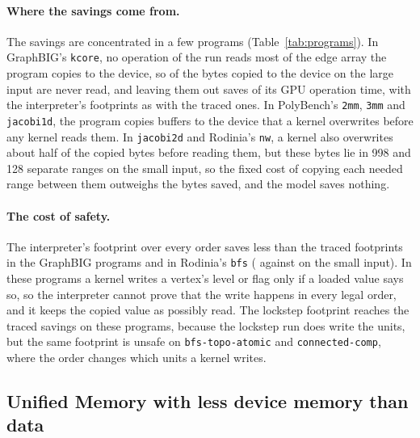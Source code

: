 \documentclass[11pt]{article}
\newcommand{\tabref}[1]{Table~\ref{#1}}
\newcommand{\code}[1]{\texttt{#1}}
\begin{document}
\paragraph{Where the savings come from.} The savings are concentrated in a few programs (\tabref{tab:programs}).
In GraphBIG's \code{kcore}, no operation of the run reads most of the edge array the program copies to the
device, so \numLargeKcoreHtoDUnneeded{} of the bytes copied to the device on the large input are never read, and
leaving them out saves \numLargeKcoreTr{} of its GPU operation time, with the interpreter's footprints as with the
traced ones. In PolyBench's \code{2mm}, \code{3mm} and \code{jacobi1d}, the program copies buffers to the device
that a kernel overwrites before any kernel reads them. In \code{jacobi2d} and Rodinia's \code{nw}, a kernel also
overwrites about half of the copied bytes before reading them, but these bytes lie in 998 and 128 separate ranges
on the small input, so the fixed cost of copying each needed range between them outweighs the bytes saved, and the
model saves nothing.

\paragraph{The cost of safety.} The interpreter's footprint over every order saves less than the traced footprints
in the GraphBIG programs and in Rodinia's \code{bfs} (\numSmallBfsHy{} against \numSmallBfsTr{} on the small input).
In these programs a kernel writes a vertex's level or flag only if a loaded value says so, so the interpreter cannot
prove that the write happens in every legal order, and it keeps the copied value as possibly read. The lockstep
footprint reaches the traced savings on these programs, because the lockstep run does write the units, but the same
footprint is unsafe on \code{bfs-topo-atomic} and \code{connected-comp}, where the order changes which units a
kernel writes.

\subsection{Unified Memory with less device memory than data}
\label{sec:eval-uvm}

\begin{table}[tbp]
\centering
\scriptsize
\setlength{\tabcolsep}{2.5pt}

\caption{Unified Memory with each policy: the programs and shares of device memory at which every operation (with
kernels as whole operations) or every wave fits in less memory than the program's data, and the geometric-mean
speedup over demand paging of buffer prefetching, of prefetching every page with the interpreter's and the traced
footprints, of prefetching only long runs of pages with them, and of prefetching only long runs with the ranges of
pages and with the history of earlier launches, under the costs measured on the A30, and of buffer and interpreter
prefetching under the assumed costs at 25~\textmu s per batch of faults.}
\label{tab:uvm-summary}
\end{table}
\end{document}
